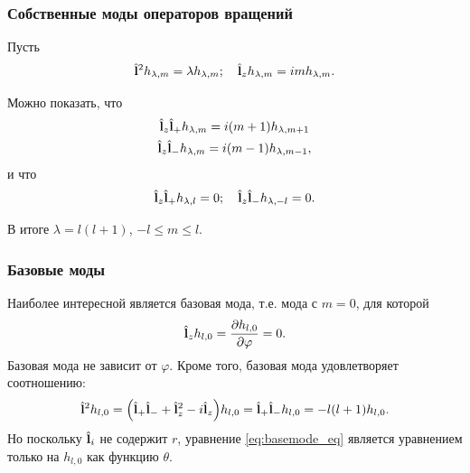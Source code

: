 \documentclass{beamer}
\begin{document}
    \begin{frame}\frametitle{Собственные моды операторов вращений}

        Пусть
        \begin{equation}\begin{gathered}
            \hat{\mathbf{l}}^2 h_{\lambda,m} = \lambda h_{\lambda,m} ; \quad
            \hat{\mathbf{l}}_z h_{\lambda,m} = i m h_{\lambda,m} .
        \end{gathered}\end{equation}

        Можно показать, что
        \begin{equation}\begin{gathered}
            \hat{\mathbf{l}}_z \hat{\mathbf{l}}_{+} h_{\lambda,m} = i (m + 1) h_{\lambda,m+1} \\
            \hat{\mathbf{l}}_z \hat{\mathbf{l}}_{-} h_{\lambda,m} = i (m - 1) h_{\lambda,m-1} ,
        \end{gathered}\end{equation}
        и что
        \begin{equation}\begin{gathered}
            \hat{\mathbf{l}}_z \hat{\mathbf{l}}_{+} h_{\lambda,l} = 0 ; \quad
            \hat{\mathbf{l}}_z \hat{\mathbf{l}}_{-} h_{\lambda,-l} = 0 .
        \end{gathered}\end{equation}

        В итоге $\lambda = l (l + 1)$, $- l \le m \le l$.

    \end{frame}


    \begin{frame}\frametitle{Базовые моды}

        Наиболее интересной является базовая мода, т.е. мода с $m = 0$, для которой
        \begin{equation}
            \hat{\mathbf{l}}_z h_{l, 0} = \pdv{h_{l, 0}}{\varphi} = 0 .
        \end{equation}
        Базовая мода не зависит от $\varphi$. Кроме того, базовая мода удовлетворяет соотношению:
        \begin{equation}\label{eq:basemode_eq}
            \hat{\mathbf{l}}^2 h_{l, 0}
                = \qty( \hat{\mathbf{l}}_{+} \hat{\mathbf{l}}_{-} + \hat{\mathbf{l}}_z^2 - i \hat{\mathbf{l}}_z ) h_{l, 0}
                = \hat{\mathbf{l}}_{+} \hat{\mathbf{l}}_{-} h_{l, 0}
                = - l (l + 1) h_{l, 0} .
        \end{equation}
        Но поскольку $\hat{\mathbf{l}}_i$ не содержит $r$, уравнение \autoref{eq:basemode_eq} является уравнением только на $h_{l, 0}$ как функцию $\theta$.

    \end{frame}
\end{document}
